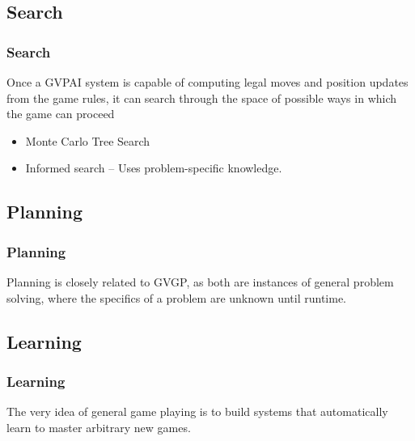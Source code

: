 \documentclass{beamer}
\begin{document}
\subsection{Search}
\begin{frame}
  \frametitle{Search\cite{12}}
  Once a GVPAI system is capable of computing legal moves and position updates from the game rules, it can search through the space of possible ways in which the game can proceed
  \begin{itemize}
    \item Monte Carlo Tree Search
    \item Informed search -- Uses problem-specific knowledge.
  \end{itemize}

\end{frame}

\subsection{Planning}
\begin{frame}
  \frametitle{Planning}
  Planning is closely related to GVGP, as both are instances of general problem solving, where the specifics of a problem are unknown until runtime.
\end{frame}

\subsection{Learning}
\begin{frame}
  \frametitle{Learning}
  The very idea of general game playing is to build systems that automatically learn to master arbitrary new games.
  

\end{frame}

\end{document}
